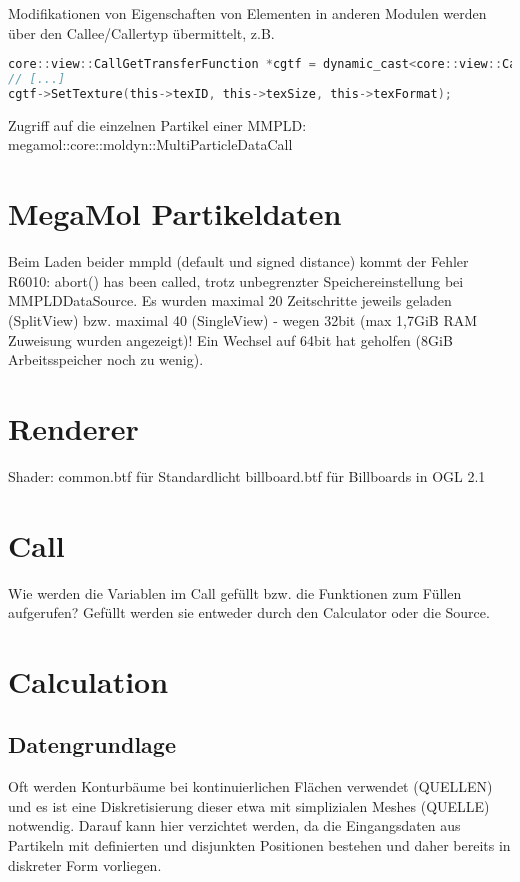Modifikationen von Eigenschaften von Elementen in anderen Modulen werden über den Callee/Callertyp übermittelt, z.B.

\begin{lstlisting}[language=c]
core::view::CallGetTransferFunction *cgtf = dynamic_cast<core::view::CallGetTransferFunction*>(&call);
// [...]
cgtf->SetTexture(this->texID, this->texSize, this->texFormat);
\end{lstlisting}

Zugriff auf die einzelnen Partikel einer MMPLD: megamol::core::moldyn::MultiParticleDataCall


\section{MegaMol Partikeldaten}
Beim Laden beider mmpld (default und signed distance) kommt der Fehler R6010: abort() has been called, trotz unbegrenzter Speichereinstellung bei MMPLDDataSource. Es wurden maximal 20 Zeitschritte jeweils geladen (SplitView) bzw. maximal 40 (SingleView) - wegen 32bit (max 1,7GiB RAM Zuweisung wurden angezeigt)! Ein Wechsel auf 64bit hat geholfen (8GiB Arbeitsspeicher noch zu wenig).


\section{Renderer}
Shader:
common.btf für Standardlicht
billboard.btf für Billboards in OGL 2.1

\section{Call}

Wie werden die Variablen im Call gefüllt bzw. die Funktionen zum Füllen aufgerufen? Gefüllt werden sie entweder durch den Calculator oder die Source.

\section{Calculation}

\subsection{Datengrundlage}

Oft werden Konturbäume bei kontinuierlichen Flächen verwendet (QUELLEN) und es ist eine Diskretisierung dieser etwa mit simplizialen Meshes (QUELLE) notwendig. Darauf kann hier verzichtet werden, da die Eingangsdaten aus Partikeln mit definierten und disjunkten Positionen bestehen und daher bereits in diskreter Form vorliegen.


